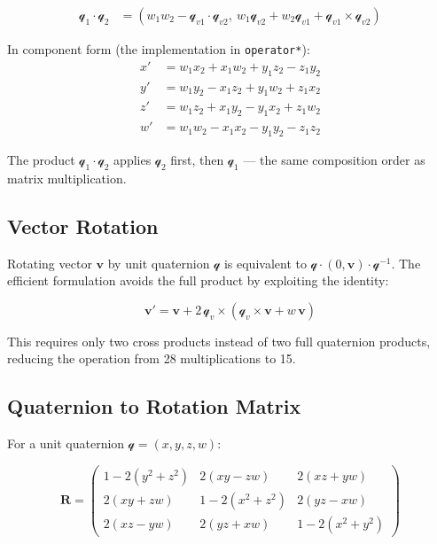 \begin{align}
\mathcal{q}_1 \cdot \mathcal{q}_2 &=
(w_1 w_2 - \mathcal{q}_{v1} \cdot \mathcal{q}_{v2},\
 w_1 \mathcal{q}_{v2} + w_2 \mathcal{q}_{v1} + \mathcal{q}_{v1} \times \mathcal{q}_{v2})
\end{align}

In component form (the implementation in \texttt{operator*}):
\begin{align}
x' &= w_1 x_2 + x_1 w_2 + y_1 z_2 - z_1 y_2 \\
y' &= w_1 y_2 - x_1 z_2 + y_1 w_2 + z_1 x_2 \\
z' &= w_1 z_2 + x_1 y_2 - y_1 x_2 + z_1 w_2 \\
w' &= w_1 w_2 - x_1 x_2 - y_1 y_2 - z_1 z_2
\end{align}

The product $\mathcal{q}_1 \cdot \mathcal{q}_2$ applies $\mathcal{q}_2$ first,
then $\mathcal{q}_1$ --- the same composition order as matrix multiplication.

\subsection{Vector Rotation}

Rotating vector $\mathbf{v}$ by unit quaternion $\mathcal{q}$ is equivalent to
$\mathcal{q} \cdot (0, \mathbf{v}) \cdot \mathcal{q}^{-1}$.
The efficient formulation avoids the full product by exploiting the identity:

\begin{equation}
\mathbf{v}' = \mathbf{v} + 2\,\mathcal{q}_v \times (\mathcal{q}_v \times \mathbf{v} + w\,\mathbf{v})
\label{eq:quat-rotate}
\end{equation}

This requires only two cross products instead of two full quaternion products,
reducing the operation from 28 multiplications to 15.

\subsection{Quaternion to Rotation Matrix}

For a unit quaternion $\mathcal{q} = (x, y, z, w)$:

\[
\mathbf{R} =
\begin{pmatrix}
1 - 2(y^2+z^2) & 2(xy - zw)     & 2(xz + yw) \\
2(xy + zw)     & 1 - 2(x^2+z^2) & 2(yz - xw) \\
2(xz - yw)     & 2(yz + xw)     & 1 - 2(x^2+y^2)
\end{pmatrix}
\]

